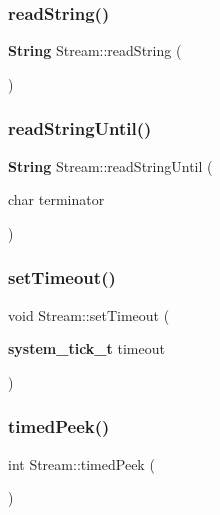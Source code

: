 \mbox{\label{class_stream_a1c60bdda2b65d78e5a1362d51b856c5a}} 
\subsubsection{read\+String()}
{\footnotesize\ttfamily \textbf{ String} Stream\+::read\+String (\begin{DoxyParamCaption}{ }\end{DoxyParamCaption})}

\mbox{\label{class_stream_a6a409da87c552909260d8cc428c5ca70}} 
\subsubsection{read\+String\+Until()}
{\footnotesize\ttfamily \textbf{ String} Stream\+::read\+String\+Until (\begin{DoxyParamCaption}\item[{char}]{terminator }\end{DoxyParamCaption})}

\mbox{\label{class_stream_abaa50647d6dbb3baf7697a2691a06177}} 
\subsubsection{set\+Timeout()}
{\footnotesize\ttfamily void Stream\+::set\+Timeout (\begin{DoxyParamCaption}\item[{\textbf{ system\+\_\+tick\+\_\+t}}]{timeout }\end{DoxyParamCaption})}

\mbox{\label{class_stream_ae326bf60a3c5276836526710871046fe}} 
\subsubsection{timed\+Peek()}
{\footnotesize\ttfamily int Stream\+::timed\+Peek (\begin{DoxyParamCaption}{ }\end{DoxyParamCaption})\hspace{0.3cm}{\ttfamily [protected]}}

